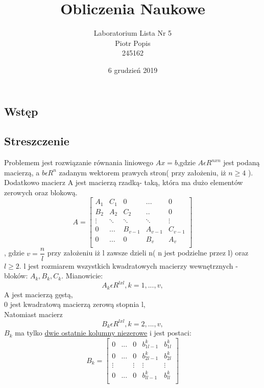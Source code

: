 \documentclass[11pt]{article}
\begin{document}
\title{{Obliczenia Naukowe}}
\author{Laboratorium Lista Nr 5\\Piotr Popis\\ 245162}
\date{6 grudzień 2019}
\maketitle
\centering

\begin{flushleft}
\section{Wstęp}
\subsection{Streszczenie}
Problemem jest rozwiązanie równania liniowego $Ax=b$,gdzie $A \epsilon R^{nxn}$ jest podaną macierzą, a $b \epsilon R^n$ zadanym wektorem prawych stron( przy założeniu, iż $n \geq 4$ ).
Dodatkowo macierz A jest macierzą rzadką- taką, która ma dużo elementów zerowych oraz blokową.
\[
A=\begin{bmatrix}
      A_1 & C_1 & 0 & ... & 0 \\
    B_2 & A_2 & C_2 & .. & 0 \\
    \vdots & \ddots & \ddots & \ddots & \vdots \\
     0 & ... & B_{v-1} & A_{v-1} & C_{v-1} \\
      0 & ... & 0 & B_v & A_v \\
  \end{bmatrix}
\]
, gdzie $v=\dfrac{n}{l}$ przy założeniu iż l zawsze dzieli n( n jest podzielne przez l) oraz $l\geq2$. l jest rozmiarem wszystkich kwadratowych macierzy wewnętrznych - bloków: $A_k, B_k, C_k$. Mianowicie: $$A_k \epsilon R^{lxl}, k = 1,...,v  ,$$ A jest macierzą gęstą, \\0 jest kwadratową macierzą zerową stopnia l,\\Natomiast macierz $$B_k \epsilon R^{lxl}, k = 2,...,v  ,$$ $B_k$ ma tylko \underline{dwie ostatnie kolumny niezerowe} i jest postaci:   
\[
B_k=\begin{bmatrix}
      0 & ... & 0 & b^k_{1l-1} & b^k_{1l} \\
      0 & ... & 0 & b^k_{2l-1} & b^k_{2l} \\
      \vdots &     & \vdots & \vdots & \vdots \\
      0 & ... & 0 & b^k_{ll-1} & b^k_{ll} \\
  \end{bmatrix}
\]
\end{flushleft}
\end{document}
